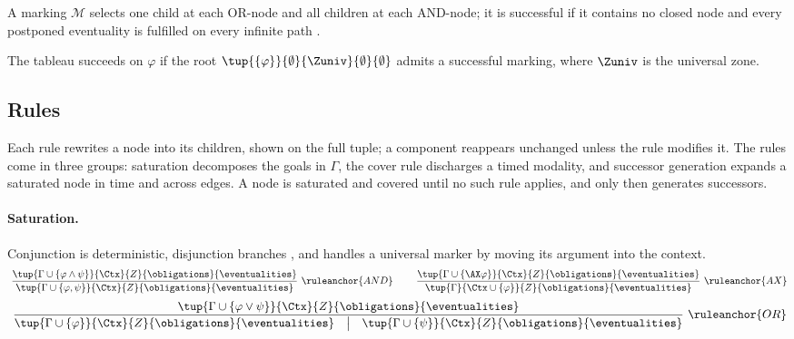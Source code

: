A {marking} $\mathcal{M}$ selects one child at each OR-node and
{all} children at each AND-node; it is {successful} if it contains no closed node and every
postponed eventuality is fulfilled on every infinite path %
.


The tableau {succeeds} on $\varphi$ if the root
$\tup{\{\varphi\}}{\emptyset}{\Zuniv}{\emptyset}{\emptyset}$ admits a successful marking, where $\Zuniv$ is the
universal zone.

\subsection{Rules}\label{ss:rules}

Each rule rewrites a node into its children, shown on the full tuple; a component reappears unchanged unless the rule modifies it. The rules come in three groups: {saturation} decomposes the goals in $\Gamma$, the {cover} rule discharges a timed modality, and {successor generation} expands a saturated node in time and across edges. A node is saturated and covered until no such rule applies, and only then generates successors.

\paragraph{Saturation.}
Conjunction is deterministic, disjunction branches , and  handles a universal marker by moving its argument into the context.
\[
\ \frac{\tup{\Gamma\cup\{\varphi\land\psi\}}{\Ctx}{Z}{\obligations}{\eventualities}}
{\tup{\Gamma\cup\{\varphi,\psi\}}{\Ctx}{Z}{\obligations}{\eventualities}}\  \ruleanchor{AND}
\qquad
 \ \frac{\tup{\Gamma\cup\{\AX\varphi\}}{\Ctx}{Z}{\obligations}{\eventualities}}
{\tup{\Gamma}{\Ctx\cup\{\varphi\}}{Z}{\obligations}{\eventualities}}\  \ruleanchor{AX}
\]
\[
 \ \frac{\tup{\Gamma\cup\{\varphi\lor\psi\}}{\Ctx}{Z}{\obligations}{\eventualities}}
{\tup{\Gamma\cup\{\varphi\}}{\Ctx}{Z}{\obligations}{\eventualities}\quad\big|\quad
\tup{\Gamma\cup\{\psi\}}{\Ctx}{Z}{\obligations}{\eventualities}}\ \ruleanchor{OR}
\]




